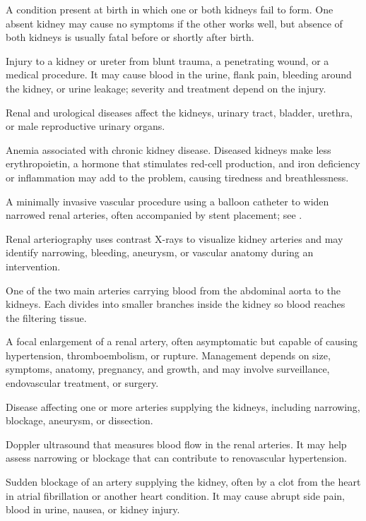  A condition present at birth in which one or both kidneys fail to form. One absent kidney may cause no symptoms if the other works well, but absence of both kidneys is usually fatal before or shortly after birth.

 Injury to a kidney or ureter from blunt trauma, a penetrating wound, or a medical procedure. It may cause blood in the urine, flank pain, bleeding around the kidney, or urine leakage; severity and treatment depend on the injury.

 Renal and urological diseases affect the kidneys, urinary tract, bladder, urethra, or male reproductive urinary organs.

 Anemia associated with chronic kidney disease. Diseased kidneys make less erythropoietin, a hormone that stimulates red-cell production, and iron deficiency or inflammation may add to the problem, causing tiredness and breathlessness.

 A minimally invasive vascular procedure using a balloon catheter to widen narrowed renal arteries, often accompanied by stent placement; see .

 Renal arteriography uses contrast X-rays to visualize kidney arteries and may identify narrowing, bleeding, aneurysm, or vascular anatomy during an intervention.

 One of the two main arteries carrying blood from the abdominal aorta to the kidneys. Each divides into smaller branches inside the kidney so blood reaches the filtering tissue.

 A focal enlargement of a renal artery, often asymptomatic but capable of causing hypertension,
thromboembolism, or rupture. Management depends on size, symptoms, anatomy, pregnancy, and
growth, and may involve surveillance, endovascular treatment, or surgery.

 Disease affecting one or more arteries supplying the kidneys, including narrowing, blockage, aneurysm, or dissection.

 Doppler ultrasound that measures blood flow in the renal arteries. It may help assess narrowing or blockage that can contribute to renovascular hypertension.

 Sudden blockage of an artery supplying the kidney, often by a clot from the heart in atrial fibrillation or another heart condition. It may cause abrupt side pain, blood in urine, nausea, or kidney injury.

